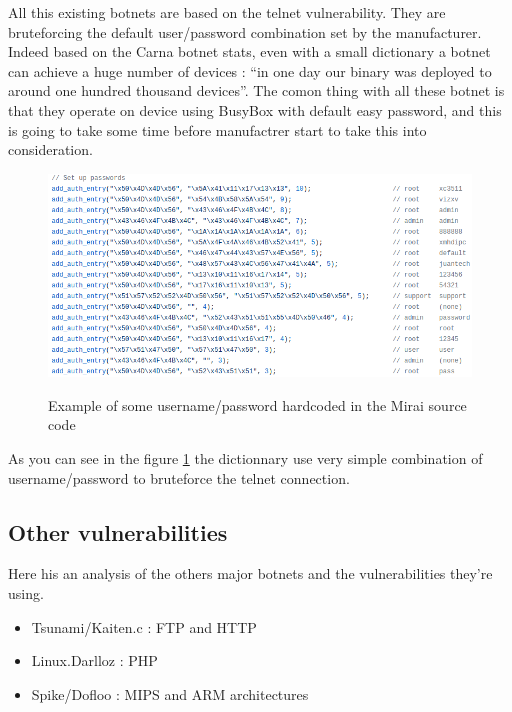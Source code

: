 \documentclass{report}
\begin{document}
All this existing botnets are based on the telnet vulnerability. They are bruteforcing the default user/password combination set by the manufacturer. Indeed based on the Carna botnet \autocite{carna} stats, even with a small dictionary a botnet can achieve a huge number of devices : ``in one day our binary was deployed to around one hundred thousand devices''.
The comon thing with all these botnet is that they operate on device using BusyBox with default easy password, and this is going to take some time before manufactrer start to take this into consideration.\newline
\begin{figure}[h]
 \caption{Example of some username/password hardcoded in the Mirai source code}
 \centering
 \includegraphics[width=1.2\textwidth]{./img/mirai-dict}
 \label{fig:mirai-dict}
\end{figure}
As you can see in the figure \ref{fig:mirai-dict} the dictionnary use very simple combination of username/password to bruteforce the telnet connection.

\subsection{Other vulnerabilities}
Here his an analysis of the others major botnets and the vulnerabilities they're using.

\begin{itemize}
 \item Tsunami/Kaiten.c \autocite{tsunami} : FTP and HTTP
 \item Linux.Darlloz \autocite{darlloz} : PHP
 \item Spike/Dofloo \autocite{spike} : MIPS and ARM architectures
\end{itemize}
\end{document}
